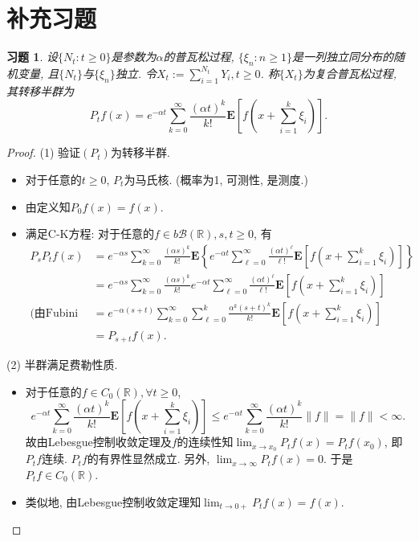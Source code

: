 \documentclass[UTF8,ondside]{ctexart}
\newtheorem{exercise}{习题}[section]
\newcommand{\h}{\mathscr}
\newcommand{\kx}{\mathbb}
\newcommand{\mbf}{\mathbf}
\numberwithin{equation}{section}
\begin{document}
	\section{补充习题}
	\begin{exercise}
		设$\{N_t:t\geq 0\}$是参数为$\alpha$的普瓦松过程, $\{\xi_n:n\geq 1\}$是一列独立同分布的随机变量, 且$\{N_t\}$与$\{\xi_n\}$独立. 令$X_t:=\sum_{i=1}^{N_t}Y_i,t\geq 0$. 称$\{X_t\}$为复合普瓦松过程, 其转移半群为
		\[
			P_t f(x)=e^{-\alpha t}\sum_{k=0}^\infty \frac{(\alpha t)^k}{k!}\mbf E[f(x+\sum_{i=1}^k\xi_i)].
		\]
	\end{exercise}
	\begin{proof}
		(1) 验证$(P_t)$为转移半群.
		\begin{itemize}
			\item 对于任意的$t\geq 0$, $P_t$为马氏核. (概率为1, 可测性, 是测度.)
			\item 由定义知$P_0 f(x) = f(x)$.
			\item 满足C-K方程: 对于任意的$f\in b\h B(\kx R), s,t\geq 0$, 有
			\[
				\begin{aligned}
				P_sP_t f(x) &= e^{-\alpha s}\sum_{k=0}^\infty \frac{(\alpha s)^k}{k!}\mbf E\left\{e^{-\alpha t}\sum_{\ell = 0}^\infty \frac{(\alpha t)^\ell}{\ell !}\mbf E\left[f(x+\sum_{i=1}^k\xi_i)\right]\right\}\\
				&= e^{-\alpha s}\sum_{k=0}^\infty \frac{(\alpha s)^k}{k!}e^{-\alpha t}\sum_{\ell = 0}^\infty \frac{(\alpha t)^\ell}{\ell !}\mbf E\left[f(x+\sum_{i=1}^k\xi_i)\right]\\
				\text{(由Fubini定理)}&= e^{-\alpha (s+t)}\sum_{k=0}^\infty \sum_{\ell = 0}^k \frac{\alpha^k (s+t)^k}{k!}\mbf E\left[f(x+\sum_{i=1}^k\xi_i)\right]\\
				&= P_{s+t} f(x).
				\end{aligned}
			\]
		\end{itemize}

		(2) 半群满足费勒性质. 
		\begin{itemize}
			\item 对于任意的$f\in C_0(\kx R),\forall t\geq 0$, 
			\[
				e^{-\alpha t}\sum_{k=0}^\infty \frac{(\alpha t)^k}{k!}\mbf E\left[f(x+\sum_{i=1}^k\xi_i)\right]
				\leq e^{-\alpha t}\sum_{k=0}^\infty \frac{(\alpha t)^k}{k!}\|f\| = \|f\| < \infty.
			\]
			故由Lebesgue控制收敛定理及$f$的连续性知$\lim_{x\rightarrow x_0}P_t f(x)=P_t f(x_0)$, 即$P_t f$连续. $P_t f$的有界性显然成立. 另外, $\lim_{x\rightarrow\infty}P_t f(x)=0$. 于是$P_t f\in C_0(\kx R)$.

			\item 类似地, 由Lebesgue控制收敛定理知$\lim_{t\rightarrow 0+}P_t f(x)=f(x)$.
		\end{itemize}


\end{proof}
\end{document}
